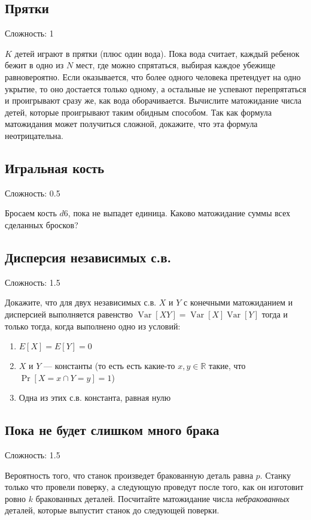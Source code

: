 \documentclass[12pt]{article}
\newcommand\R{\mathbb{R}}
\DeclareMathOperator{\Var}{Var}
\begin{document}
\subsection{Прятки}

Сложность: 1

$K$ детей играют в прятки (плюс один вода). Пока вода считает, каждый ребенок бежит в одно из $N$ мест, где можно спрятаться, выбирая каждое убежище равновероятно. Если оказывается, что более одного человека претендует на одно укрытие, то оно достается только одному, а остальные не успевают перепрятаться и проигрывают сразу же, как вода оборачивается. Вычислите матожидание числа детей, которые проигрывают таким обидным способом. Так как формула матожидания может получиться сложной, докажите, что эта формула неотрицательна.

\subsection{Игральная кость}

Сложность: 0.5

Бросаем кость $d6$, пока не выпадет единица. Каково матожидание суммы всех сделанных бросков?

\subsection{Дисперсия независимых с.в.}

Сложность: 1.5

Докажите, что для двух независимых с.в. $X$ и $Y$ с конечными матожиданием и дисперсией выполняется равенство $\Var[XY] = \Var[X]\Var[Y]$ тогда и только тогда, когда выполнено одно из условий:
\begin{enumerate}
    \item $E[X] = E[Y] = 0$
    \item $X$ и $Y$ --- константы (то есть есть какие-то $x, y \in \R$ такие, что $\Pr[X = x \cap Y = y] = 1$)
    \item Одна из этих с.в. константа, равная нулю
\end{enumerate}

\subsection{Пока не будет слишком много брака}

Сложность: 1.5

Вероятность того, что станок произведет бракованную деталь равна $p$. Станку только что провели поверку, а следующую проведут после того, как он изготовит ровно $k$ бракованных деталей. Посчитайте матожидание числа \emph{небракованных} деталей, которые выпустит станок до следующей поверки.
\end{document}
